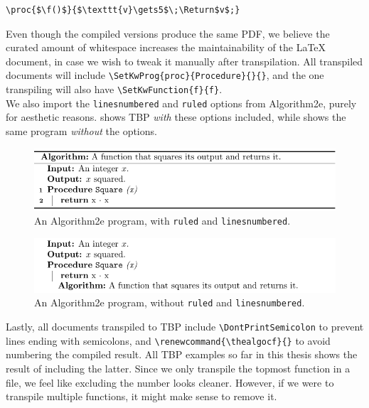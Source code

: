 \begin{lstlisting}[caption={Alternative version of f in LaTeX with Algorithm2e.}, captionpos=b, label={Alternative version of f in LaTeX with Algorithm2e.}]
\proc{$\f()$}{$\texttt{v}\gets5$\;\Return$v$;}
\end{lstlisting}

Even though the compiled versions produce the same PDF, we believe the curated amount of whitespace increases the maintainability of the LaTeX document, in case we wish to tweak it manually after transpilation. All transpiled documents will include \texttt{\textbackslash SetKwProg\{proc\}\{Procedure\}\{\}\{\}}, and the one transpiling  will also have \texttt{\textbackslash SetKwFunction\{f\}\{f\}}. \\

We also import the \texttt{linesnumbered} and \texttt{ruled} options from Algorithm2e, purely for aesthetic reasons.  shows TBP \textit{with} these options included, while  shows the same program \textit{without} the options. \\

\begin{figure}[ht]
    \centering
    \includegraphics[scale=.95]{assets/chapter4/SquareWithOptions.pdf}
    \caption{An Algorithm2e program, with \texttt{ruled} and \texttt{linesnumbered}.}
    \label{squareWith}
\end{figure}

\begin{figure}[ht]
    \centering
    \includegraphics[scale=.95]{assets/chapter4/SquareWithoutOptions.pdf}
    \caption{An Algorithm2e program, without \texttt{ruled} and \texttt{linesnumbered}.}
    \label{squareWithout}
\end{figure}

Lastly, all documents transpiled to TBP include \texttt{\textbackslash DontPrintSemicolon} to prevent lines ending with semicolons, and \texttt{\textbackslash renewcommand\{\textbackslash thealgocf\}\{\}} to avoid numbering the compiled result. All TBP examples so far in this thesis shows the result of including the latter. Since we only transpile the topmost function in a file, we feel like excluding the number looks cleaner. However, if we were to transpile multiple functions, it might make sense to remove it.

